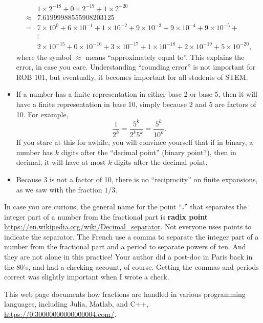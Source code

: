 \begin{itemize}
\begin{align*}
     &  1 \times 2^{-18} + 0 \times 2^{-19} + 1 \times 2^{-20} \\
     \approx& 7.619 999 885 559 082 031 25 \\
     =& 7 \times 10^{0} + 6 \times 10^{-1} + 1 \times 10^{-2} + 9 \times 10^{-3} +  9 \times 10^{-4} +  9 \times 10^{-5} + \\
     & \vdots \\
    & 2 \times 10^{-15}+ 0 \times 10^{-16}+  3 \times 10^{-17} +  1 \times 10^{-18}  +  2 \times 10^{-19} +  5 \times 10^{-20}, 
\end{align*}
where the symbol $\approx$ means ``approximately equal to''. This explains the error, in case you care. Understanding ``rounding error'' is not important for ROB 101, but eventually, it becomes important for all students of STEM.
\item If a number has a finite representation in either base 2 or base 5, then it will have a finite representation in base 10, simply because 2 and 5 are factors of 10. For example, 
$$\frac{1}{2^k} = \frac{5^k}{2^k 5 ^k} = \frac{5^k}{10 ^k}.$$
If you stare at this for awhile, you will convince yourself that if in binary, a number has $k$ digits after the ``decimal point'' (binary point?), then in decimal, it will have at most $k$ digits after the decimal point. 
\item Because 3 is not a factor of 10, there is no ``reciprocity'' on finite expansions, as we saw with the fraction $1/3$.    
    \end{itemize}


\begin{notation} In case you are curious, the general name for the point ``\textbf{\large .}'' that separates the integer part of a number from the fractional part is \textbf{radix point} \url{https://en.wikipedia.org/wiki/Decimal_separator}. Not everyone uses points to indicate the separator. The French use a comma to separate the integer part of a number from the fractional part and a period to separate powers of ten. And they are not alone in this practice! Your author did a post-doc in Paris back in the 80's, and had a checking account, of course. Getting the commas and periods correct was slightly important when I wrote a check.
\end{notation}

\begin{rem} This web page documents how fractions are handled in various programming languages, including Julia, Matlab, and C++, \url{https://0.30000000000000004.com/}. 
\end{rem}


